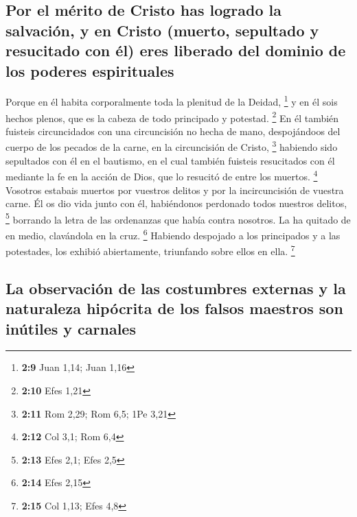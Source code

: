 \hypertarget{por-el-muxe9rito-de-cristo-has-logrado-la-salvaciuxf3n-y-en-cristo-muerto-sepultado-y-resucitado-con-uxe9l-eres-liberado-del-dominio-de-los-poderes-espirituales}{%
\subsection{Por el mérito de Cristo has logrado la salvación, y en
Cristo (muerto, sepultado y resucitado con él) eres liberado del dominio
de los poderes
espirituales}\label{por-el-muxe9rito-de-cristo-has-logrado-la-salvaciuxf3n-y-en-cristo-muerto-sepultado-y-resucitado-con-uxe9l-eres-liberado-del-dominio-de-los-poderes-espirituales}}

 Porque en él habita corporalmente toda la plenitud de la
Deidad, \footnote{\textbf{2:9} Juan 1,14; Juan 1,16}  y
en él sois hechos plenos, que es la cabeza de todo principado y
potestad. \footnote{\textbf{2:10} Efes 1,21}  En él
también fuisteis circuncidados con una circuncisión no hecha de mano,
despojándoos del cuerpo de los pecados de la carne, en la circuncisión
de Cristo, \footnote{\textbf{2:11} Rom 2,29; Rom 6,5; 1Pe 3,21}
 habiendo sido sepultados con él en el bautismo, en el
cual también fuisteis resucitados con él mediante la fe en la acción de
Dios, que lo resucitó de entre los muertos. \footnote{\textbf{2:12} Col
  3,1; Rom 6,4}  Vosotros estabais muertos por vuestros
delitos y por la incircuncisión de vuestra carne. Él os dio vida junto
con él, habiéndonos perdonado todos nuestros delitos, \footnote{\textbf{2:13}
  Efes 2,1; Efes 2,5}  borrando la letra de las
ordenanzas que había contra nosotros. La ha quitado de en medio,
clavándola en la cruz. \footnote{\textbf{2:14} Efes 2,15}
 Habiendo despojado a los principados y a las potestades,
los exhibió abiertamente, triunfando sobre ellos en ella. \footnote{\textbf{2:15}
  Col 1,13; Efes 4,8}

\hypertarget{la-observaciuxf3n-de-las-costumbres-externas-y-la-naturaleza-hipuxf3crita-de-los-falsos-maestros-son-inuxfatiles-y-carnales}{%
\subsection{La observación de las costumbres externas y la naturaleza
hipócrita de los falsos maestros son inútiles y
carnales}\label{la-observaciuxf3n-de-las-costumbres-externas-y-la-naturaleza-hipuxf3crita-de-los-falsos-maestros-son-inuxfatiles-y-carnales}}

